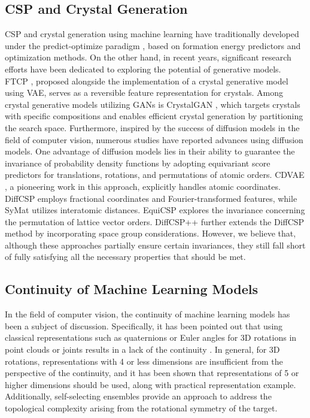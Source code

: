 \subsection{CSP and Crystal Generation}
CSP and crystal generation using machine learning have traditionally developed under the predict-optimize paradigm \cite{Predict_Optimize}, based on formation energy predictors and optimization methods. On the other hand, in recent years, significant research efforts have been dedicated to exploring the potential of generative models. FTCP \cite{FTCP}, proposed alongside the implementation of a crystal generative model using VAE, serves as a reversible feature representation for crystals. Among crystal generative models utilizing GANs is CrystalGAN \cite{CrystalGAN}, which targets crystals with specific compositions and enables efficient crystal generation by partitioning the search space. Furthermore, inspired by the success of diffusion models in the field of computer vision, numerous studies have reported advances using diffusion models. One advantage of diffusion models lies in their ability to guarantee the invariance of probability density functions by adopting equivariant score predictors for translations, rotations, and permutations of atomic orders. CDVAE \cite{CDVAE}, a pioneering work in this approach, explicitly handles atomic coordinates. DiffCSP \cite{DiffCSP} employs fractional coordinates and Fourier-transformed features, while SyMat \cite{SyMat} utilizes interatomic distances. EquiCSP \cite{EquiCSP} explores the invariance concerning the permutation of lattice vector orders. DiffCSP++ \cite{DiffCSP++} further extends the DiffCSP method by incorporating space group considerations. However, we believe that, although these approaches partially ensure certain invariances, they still fall short of fully satisfying all the necessary properties that should be met.

\subsection{Continuity of Machine Learning Models}
In the field of computer vision, the continuity of machine learning models has been a subject of discussion. Specifically, it has been pointed out that using classical representations such as quaternions or Euler angles for 3D rotations in point clouds or joints results in a lack of the continuity \cite{Continuity_Rotation}. In general, for 3D rotations, representations with 4 or less dimensions are insufficient from the perspective of the continuity, and it has been shown that representations of 5 or higher dimensions should be used, along with practical representation example. Additionally, self-selecting ensembles \cite{Self_Selecting_Ensambles} provide an approach to address the topological complexity arising from the rotational symmetry of the target.

